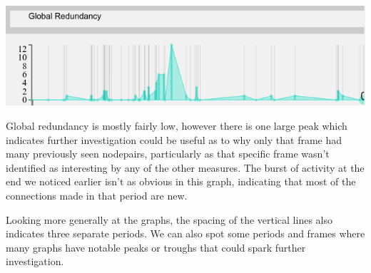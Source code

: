 \begin{center}
\includegraphics[trim={0 0 0 0}, width=140mm]{./Figures/marieBoucherGlobalRedundancy.png}
\end{center}
Global redundancy is mostly fairly low, however there is one large peak which indicates further investigation could be useful as to why only that frame had many previously seen nodepairs, particularly as that specific frame wasn't identified as interesting by any of the other measures. The burst of activity at the end we noticed earlier isn't as obvious in this graph, indicating that most of the connections made in that period are new.
    
Looking more generally at the graphs, the spacing of the vertical lines also indicates three separate periods. We can also spot some periods and frames where many graphs have notable peaks or troughs that could spark further investigation.
    
